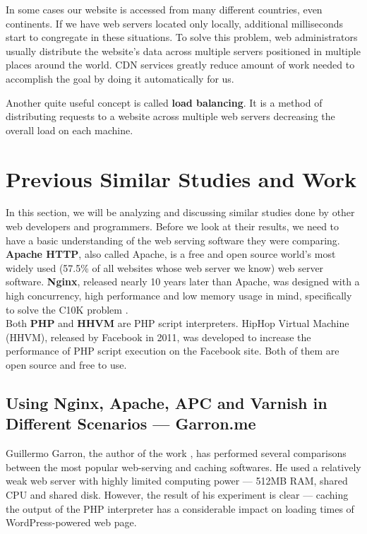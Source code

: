 In some cases our website is accessed from many different countries, even continents. If we have web servers located only locally, additional milliseconds start to congregate in these situations. To solve this problem, web administrators usually distribute the website’s data across multiple servers positioned in multiple places around the world. CDN services greatly reduce amount of work needed to accomplish the goal by doing it automatically for us.

Another quite useful concept is called \textbf{load balancing}. It is a method of distributing requests to a website across multiple web servers decreasing the overall load on each machine.

\section{Previous Similar Studies and Work}

In this section, we will be analyzing and discussing similar studies done by other web developers and programmers. Before we look at their results, we need to have a basic understanding of the web serving software they were comparing. \\

\textbf{Apache HTTP}, also called Apache, is a free and open source world's most widely used (57.5\%\cite{Apache:Usage} of all websites whose web server we know) web server software. \textbf{Nginx}, released nearly 10 years later than Apache, was designed with a high concurrency, high performance and low memory usage in mind, specifically to solve the C10K problem \cite{Nginx:c10k}. \\

Both \textbf{PHP} and \textbf{HHVM} are PHP script interpreters. HipHop Virtual Machine (HHVM), released by Facebook in 2011, was developed to increase the performance of PHP script execution on the Facebook site. Both of them are open source and free to use.

\subsection{Using Nginx, Apache, APC and Varnish in Different Scenarios — Garron.me}

Guillermo Garron, the author of the work \cite{Study:Perf-Garron}, has performed several comparisons between the most popular web-serving and caching softwares. He used a relatively weak web server with highly limited computing power — 512MB RAM, shared CPU and shared disk. However, the result of his experiment is clear — caching the output of the PHP interpreter has a considerable impact on loading times of WordPress-powered web page. \\

